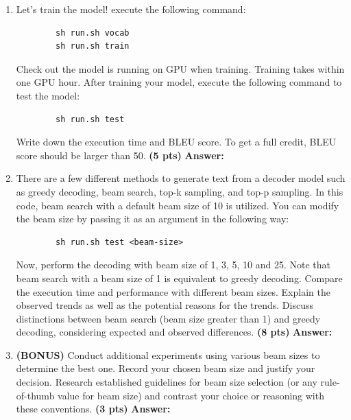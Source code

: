 \documentclass{assignment format}
\newenvironment{answer}{
    {\bf Answer:} \begingroup\color{red}
}{\endgroup}%
\begin{document}
\begin{enumerate}[label=(\alph*)]
    \item Let's train the model! execute the following command:
    \begin{verbatim}
        sh run.sh vocab
        sh run.sh train
    \end{verbatim}
    Check out the model is running on GPU when training. Training takes within one GPU hour. After training your model, execute the following command to test the model:
    \begin{verbatim}
        sh run.sh test
    \end{verbatim}
    Write down the execution time and BLEU score. To get a full credit, BLEU score should be larger than 50. \textbf{(5 pts)}
    \begin{answer} 
    \end{answer}  
        
    \item There are a few different methods to generate text from a decoder model such as greedy decoding, beam search, top-k sampling, and top-p sampling. In this code, beam search with a default beam size of 10 is utilized. You can modify the beam size by passing it as an argument in the following way: 
    \begin{verbatim}
        sh run.sh test <beam-size>
    \end{verbatim}
     Now, perform the decoding with beam size of 1, 3, 5, 10 and 25. Note that beam search with a beam size of 1 is equivalent to greedy decoding. Compare the execution time and performance with different beam sizes. Explain the observed trends as well as the potential reasons for the trends.  Discuss distinctions between beam search (beam size greater than 1) and greedy decoding, considering expected and observed differences.
     \textbf{(8 pts)}
    \begin{answer} 
    \end{answer}  
    
    \item \textbf{(BONUS)} Conduct additional experiments using various beam sizes to determine the best one. Record your chosen beam size and justify your decision. Research established guidelines for beam size selection (or any rule-of-thumb value for beam size) and contrast your choice or reasoning with these conventions.
     \textbf{(3 pts)}
    \begin{answer} 
    \end{answer}  
\end{enumerate}
\end{document}

